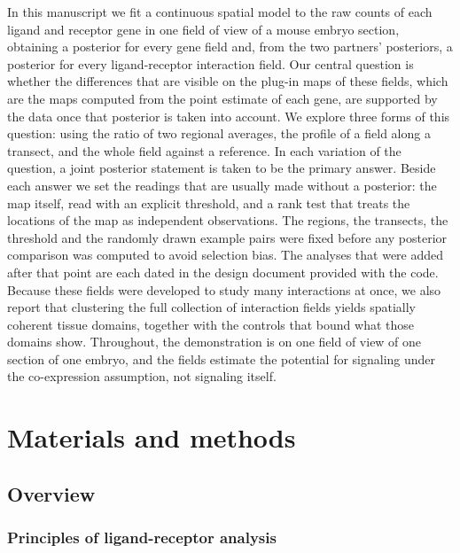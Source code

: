 \documentclass[10pt,letterpaper]{article}
\begin{document}
In this manuscript we fit a continuous spatial model to the raw counts of each ligand and receptor gene in one field of view of a mouse embryo section, obtaining a posterior for every gene field and, from the two partners' posteriors, a posterior for every ligand-receptor interaction field. Our central question is whether the differences that are visible on the plug-in maps of these fields, which are the maps computed from the point estimate of each gene, are supported by the data once that posterior is taken into account. We explore three forms of this question: using the ratio of two regional averages, the profile of a field along a transect, and the whole field against a reference. In each variation of the question, a joint posterior statement is taken to be the primary answer. Beside each answer we set the readings that are usually made without a posterior: the map itself, read with an explicit threshold, and a rank test that treats the locations of the map as independent observations. The regions, the transects, the threshold and the randomly drawn example pairs were fixed before any posterior comparison was computed to avoid selection bias. The analyses that were added after that point are each dated in the design document provided with the code. Because these fields were developed to study many interactions at once, we also report that clustering the full collection of interaction fields yields spatially coherent tissue domains, together with the controls that bound what those domains show. Throughout, the demonstration is on one field of view of one section of one embryo, and the fields estimate the potential for signaling under the co-expression assumption, not signaling itself.

\section*{Materials and methods}\label{sec:materials}

\subsection*{Overview}

\subsubsection*{Principles of ligand-receptor analysis}
\end{document}
